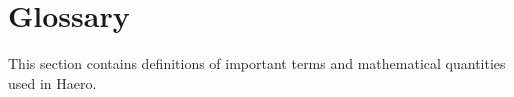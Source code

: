 \chapter{Glossary}

This section contains definitions of important terms and mathematical quantities
used in Haero.

